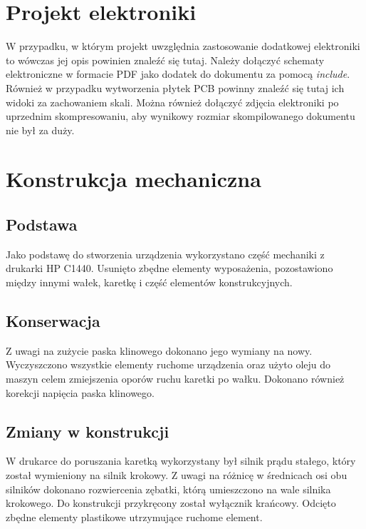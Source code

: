 \documentclass[10pt, a4paper]{article}
\begin{document}
\section{Projekt elektroniki}



W przypadku, w którym projekt uwzględnia zastosowanie 
dodatkowej elektroniki to wówczas jej opis powinien znaleźć się tutaj.
Należy dołączyć schematy elektroniczne w formacie PDF 
jako dodatek do dokumentu 
za pomocą \textit{include}. Również w przypadku wytworzenia 
płytek PCB powinny znaleźć się tutaj ich widoki za zachowaniem skali.
Można również dołączyć zdjęcia 
elektroniki po uprzednim skompresowaniu, aby wynikowy rozmiar 
skompilowanego dokumentu nie był za duży.
\section{Konstrukcja mechaniczna}

\subsection{Podstawa}
Jako podstawę do stworzenia urządzenia wykorzystano część mechaniki z drukarki HP C1440. Usunięto zbędne elementy wyposażenia, pozostawiono między innymi wałek, karetkę i część elementów konstrukcyjnych.


\subsection{Konserwacja}
Z uwagi na zużycie paska klinowego dokonano jego wymiany na nowy. Wyczyszczono wszystkie elementy ruchome urządzenia oraz użyto oleju do maszyn celem zmiejszenia oporów ruchu karetki po wałku. Dokonano również korekcji napięcia paska klinowego. 

\subsection{Zmiany w konstrukcji}
W drukarce do poruszania karetką wykorzystany był silnik prądu stałego, który został wymieniony na silnik krokowy. Z uwagi na różnicę w średnicach osi obu silników dokonano rozwiercenia zębatki, którą umieszczono na wale silnika krokowego. Do konstrukcji przykręcony został wyłącznik krańcowy.
Odcięto zbędne elementy plastikowe utrzymujące ruchome element.
\end{document}
